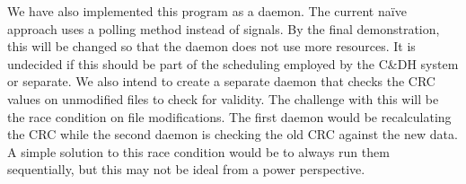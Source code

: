 We have also implemented this program as a daemon. The current na\"ive approach 
uses a polling method instead of signals.  By the final demonstration, this
will be changed so that the daemon does not use more resources.  It is undecided
if this should be part of the  scheduling employed by the C\&DH system
or separate.  We also intend to create a separate daemon that checks the CRC 
values on unmodified files to check for validity.  The challenge with this will
be the race condition on file modifications.  The first daemon would be
recalculating the CRC while the second daemon is checking the old CRC against
the new data.  A simple solution to this race condition would be to always run
them sequentially, but this may not be ideal from a power perspective.
